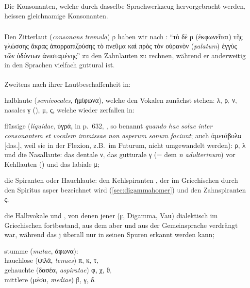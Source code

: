 \noindent Die Konsonanten, welche durch dasselbe Sprachwerkzeug hervorgebracht werden, heissen gleichnamige Konsonanten.

	{\small\noindent\subparagraph{} Den Zitterlaut (\emph{consonans tremula}) ρ haben wir
		nach : “τὸ δὲ ρ
		(ἐκφωνεῖται) τῆς γλώσσης ἄκρας ἀπορραπιζούσης τὸ πνεῦμα καὶ πρὸς τὸν οὐρανὸν
		(\emph{palatum}) ἐγγὺς τῶν ὀδόντων ἀνισταμένης” zu den Zahnlauten zu
		rechnen, während er anderweitig in den Sprachen vielfach guttural ist.}

\paragraph{} Zweitens nach ihrer Lautbeschaffenheit in:
\begin{compactenum}[(a)]
	\item halblaute (\emph{semivocales}, ἡμίφωνα), welche den Vokalen zunächst
	stehen: λ, ρ, ν, nasales γ (), μ, ς, welche wieder zerfallen in:
	\begin{compactenum}
		\item[(α)]
		flüssige (\emph{liquidae}, ὑγρά,  in
		 p.\ 632, , so
		benannt \emph{quando hae solae inter consonantem et vocalem immissae non asperum
			sonum faciunt}; auch ἀμετάβολα [das.], weil sie in der Flexion, z.B.\ im
		Futurum, nicht umgewandelt werden): ρ, λ und die Nasallaute: das dentale ν,
		das gutturale γ (= dem  \emph{n adulterinum}) vor
		Kehllauten () und das
		labiale μ;
		\item[(β)] die Spiranten oder Hauchlaute: den Kehlspiranten , der im
		Griechischen durch den Spiritus asper bezeichnet wird (\ref{sec:digammahomer}) und den
		Zahnspiranten ς;
		\item[(γ)] die Halbvokale  und , von denen jener (ϝ, Digamma, Vau)
		dialektisch im Griechischen fortbestand, aus dem  aber und aus der
		Gemeinsprache verdrängt war, während das j überall nur in seinen Spuren
		erkannt werden kann;
	\end{compactenum}
	\item stumme (\emph{mutae}, ἄφωνα): \\
	hauchlose (ψιλά, \emph{tenues}) π, κ, τ,\\ gehauchte (δασέα,
	\emph{aspiratae}) φ, χ, θ,\\ mittlere (μέσα, \emph{mediae}) β, γ, δ.
\end{compactenum}


